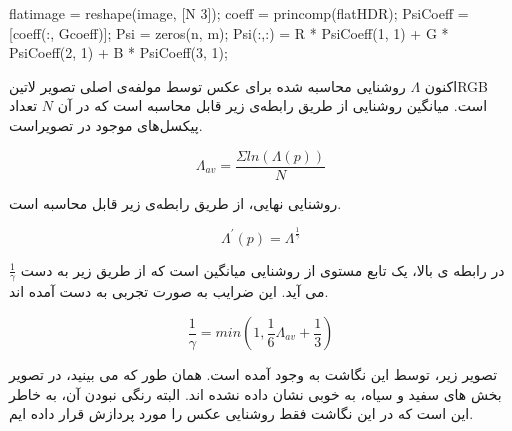  \begin{code}
 \begin{matlab}
 	 flatimage = reshape(image, [N 3]);
 	 coeff = princomp(flatHDR);
 	 PsiCoeff = [coeff(:, Gcoeff)];
 	 Psi = zeros(n, m);
 	 Psi(:,:) = R * PsiCoeff(1, 1) + G * PsiCoeff(2, 1) + B * PsiCoeff(3, 1);
 \end{matlab}
 \end{code}


اکنون $\Lambda$ روشنایی محاسبه شده برای عکس توسط مولفه‌ی اصلی تصویر
‌لاتین{RGB }
است. میانگین روشنایی از طریق رابطه‌ی زیر قابل محاسبه است که در آن $N$ تعداد پیکسل‌های موجود در تصویراست.

\begin{equation}
	\Lambda_{av} = \frac{\varSigma ln(\Lambda(p))}{N}
\end{equation}

روشنایی نهایی، از طریق رابطه‌ی زیر قابل محاسبه است.

\begin{equation}
	\Lambda^{'}(p) = \Lambda^{\frac{1}{\gamma}}	
\end{equation}

$\frac{1}{\gamma}$
در رابطه ی بالا،  یک تابع مستوی از  روشنایی میانگین است که از طریق زیر به دست می آید. این ضرایب به صورت تجربی به دست آمده اند.

\begin{equation}
	\frac{1}{\gamma} = min(1, \frac{1}{6} \Lambda_{av} + \frac{1}{3})
\end{equation}

تصویر زیر، توسط این نگاشت به وجود آمده است. همان طور که می بینید، در تصویر بخش های سفید و سیاه، به خوبی نشان داده نشده اند. البته رنگی نبودن آن، به خاطر این است که در این نگاشت فقط روشنایی عکس را مورد پردازش قرار داده ایم.

